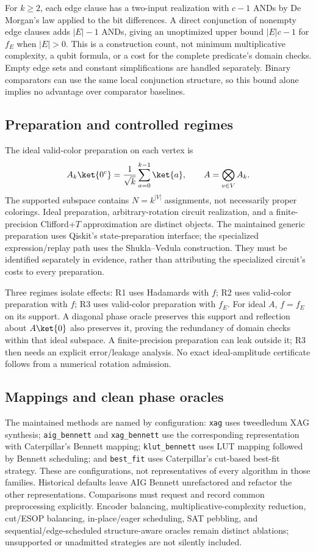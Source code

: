 \documentclass[sigconf, natbib]{acmart}
\begin{document}
For $k\geq2$, each edge clause has a two-input realization with $c-1$ ANDs by De Morgan's law applied to the bit differences. A direct conjunction of nonempty edge clauses adds $|E|-1$ ANDs, giving an unoptimized upper bound $|E|c-1$ for $f_E$ when $|E|>0$. This is a construction count, not minimum multiplicative complexity, a qubit formula, or a cost for the complete predicate's domain checks. Empty edge sets and constant simplifications are handled separately. Binary comparators can use the same local conjunction structure, so this bound alone implies no advantage over comparator baselines.

\subsection{Preparation and controlled regimes}
\label{subsec:uqs-prep}
The ideal valid-color preparation on each vertex is
\begin{equation}
 A_k\ket{0^c}=\frac{1}{\sqrt{k}}\sum_{a=0}^{k-1}\ket{a},\qquad
 A=\bigotimes_{v\in V} A_k.
\end{equation}
The supported subspace contains $N=k^{|V|}$ assignments, not necessarily proper colorings. Ideal preparation, arbitrary-rotation circuit realization, and a finite-precision Clifford+$T$ approximation are distinct objects. The maintained generic preparation uses Qiskit's state-preparation interface; the specialized expression/replay path uses the Shukla--Vedula construction. They must be identified separately in evidence, rather than attributing the specialized circuit's costs to every preparation.

Three regimes isolate effects: R1 uses Hadamards with $f$; R2 uses valid-color preparation with $f$; R3 uses valid-color preparation with $f_E$. For ideal $A$, $f=f_E$ on its support. A diagonal phase oracle preserves this support and reflection about $A\ket{0}$ also preserves it, proving the redundancy of domain checks within that ideal subspace. A finite-precision preparation can leak outside it; R3 then needs an explicit error/leakage analysis. No exact ideal-amplitude certificate follows from a numerical rotation admission.

\subsection{Mappings and clean phase oracles}
\label{subsec:mappings}
The maintained methods are named by configuration: \texttt{xag} uses tweedledum XAG synthesis; \texttt{aig\_bennett} and \texttt{xag\_bennett} use the corresponding representation with Caterpillar's Bennett mapping; \texttt{klut\_bennett} uses LUT mapping followed by Bennett scheduling; and \texttt{best\_fit} uses Caterpillar's cut-based best-fit strategy. These are configurations, not representatives of every algorithm in those families. Historical defaults leave AIG Bennett unrefactored and refactor the other representations. Comparisons must request and record common preprocessing explicitly. Encoder balancing, multiplicative-complexity reduction, cut/ESOP balancing, in-place/eager scheduling, SAT pebbling, and sequential/edge-scheduled structure-aware oracles remain distinct ablations; unsupported or unadmitted strategies are not silently included.
\end{document}

